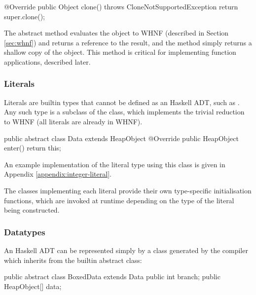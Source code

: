 \documentclass[dissertation.tex]{subfiles}
\begin{document}
{{\begin{javafigure}
{            @Override
            public Object clone() throws CloneNotSupportedException {
                return super.clone();
            }
        }
        \end{javafigure}

        The abstract  method evaluates the object to WHNF (described in Section \ref{sec:whnf}) and returns a reference to the result, and the  method simply returns a shallow copy of the object. This method is critical for implementing function applications, described later.

        \subsubsection{Literals}\label{sec:literals}
        {
            Literals are builtin types that cannot be defined as an Haskell ADT, such as . Any such type is a subclass of the  class, which implements the trivial reduction to WHNF (all literals are already in WHNF).

            \begin{javafigure}
            public abstract class Data extends HeapObject {
                @Override
                public HeapObject enter() {
                    return this;
                }
            }
            \end{javafigure}

            An example implementation of the  literal type using this class is given in Appendix \ref{appendix:integer-literal}.

            The classes implementing each literal provide their own type-specific initialisation functions, which are invoked at runtime depending on the type of the literal being constructed.
        }
        \subsubsection{Datatypes}
        {
            An Haskell ADT can be represented simply by a class generated by the compiler which inherits from the  builtin abstract class:

            \begin{javafigure}
            public abstract class BoxedData extends Data {
                public int branch;
                public HeapObject[] data;
            }
            \end{javafigure}

}}}
\end{document}
